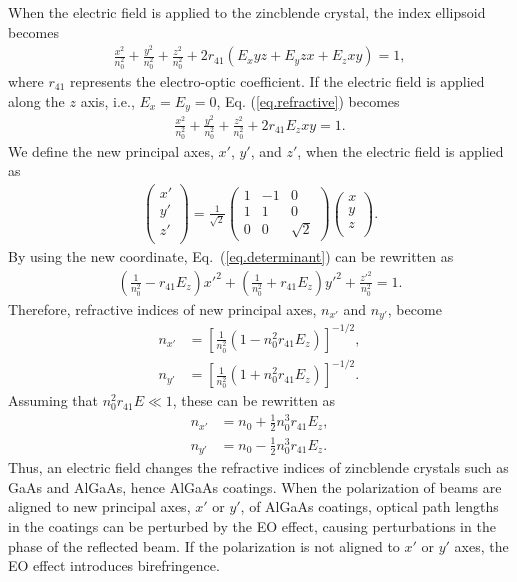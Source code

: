 \documentclass[%
 reprint,
 superscriptaddress,
 amsmath,amssymb,
 aps,
]{revtex4-2}
\begin{document}
When the electric field is applied to the zincblende crystal, the index ellipsoid becomes~\cite{Namba1961,yariv}
\begin{align}
    \frac{x^2}{n_0^2} + \frac{y^2}{n_0^2} + \frac{z^2}{n_0^2} + 2r_{41}(E_{x}yz + E_{y}zx +E_{z}xy) = 1,
    \label{eq.refractive}
\end{align}
where $r_{41}$ represents the electro-optic coefficient.
If the electric field is applied along the $z$ axis, i.e., $E_x=E_y=0$, Eq. (\ref{eq.refractive}) becomes
\begin{align}
    \frac{x^2}{n_0^2} + \frac{y^2}{n_0^2} + \frac{z^2}{n_0^2} + 2r_{41}E_zxy = 1.
    \label{eq.determinant}
\end{align}
We define the new principal axes, $x'$, $y'$, and $z'$, when the electric field is applied as
\begin{align}
    \begin{pmatrix}
    x' \\ y' \\ z' \\
    \end{pmatrix}
    = \frac{1}{\sqrt{2}}
    \begin{pmatrix}
    1 & -1 & 0 \\ 1 & 1 & 0 \\ 0 & 0 & \sqrt{2}
    \end{pmatrix}
    \begin{pmatrix}
    x \\ y \\ z \\
    \end{pmatrix}.
\end{align}
By using the new coordinate, Eq.~(\ref{eq.determinant}) can be rewritten as
\begin{align}
     \left(\frac{1}{n_0^2}-r_{41}E_z\right)x'^2 + \left(\frac{1}{n_0^2}+r_{41}E_z\right)y'^2 + \frac{z'^2}{n_0^2} = 1.
\end{align}
Therefore, refractive indices of new principal axes, $n_{x'}$ and $n_{y'}$, become 
\begin{align}
    n_{x'} &= \left[\frac{1}{n_0^2}\left(1-n_0^2r_{41}E_z\right)\right]^{-1/2}, \\
    n_{y'} &= \left[\frac{1}{n_0^2}\left(1+n_0^2r_{41}E_z\right)\right]^{-1/2}.
\end{align}
Assuming that $n_0^2r_{41}E \ll 1$, these can be rewritten as
\begin{align}
    n_{x'} &= n_0 + \frac{1}{2}n_0^3r_{41}E_z, \\
    n_{y'} &= n_0 - \frac{1}{2}n_0^3r_{41}E_z.
\end{align}
Thus, an electric field changes the refractive indices of zincblende crystals such as GaAs and AlGaAs, hence AlGaAs coatings.
When the polarization of beams are aligned to new principal axes, $x'$ or $y'$, of AlGaAs coatings, optical path lengths in the coatings can be perturbed by the EO effect, causing perturbations in the phase of the reflected beam.
If the polarization is not aligned to $x'$ or $y'$ axes, the EO effect introduces birefringence.
\end{document}
